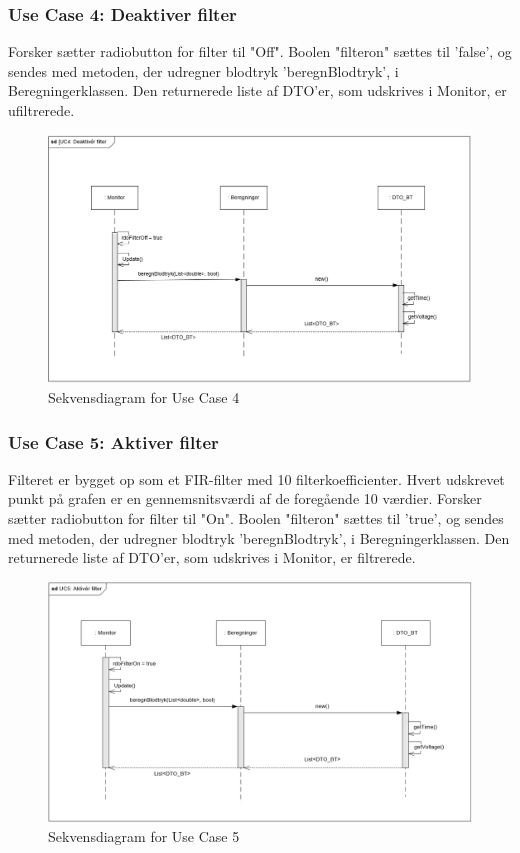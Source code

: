 \subsubsection{Use Case 4: Deaktiver filter}
Forsker sætter radiobutton for filter til "Off".
Boolen "filteron" sættes til 'false', og sendes med metoden, der udregner blodtryk 'beregnBlodtryk', i Beregningerklassen. Den returnerede liste af DTO'er, som udskrives i Monitor, er ufiltrerede.

\begin{figure}[H]
	\centering
	\includegraphics[width=1\textwidth]{Figurer/UC4_SD_SW}
	\caption{Sekvensdiagram for Use Case 4}
\end{figure}

\subsubsection{Use Case 5: Aktiver filter}
Filteret er bygget op som et FIR-filter med 10 filterkoefficienter. Hvert udskrevet punkt på grafen er en gennemsnitsværdi af de foregående 10 værdier.
Forsker sætter radiobutton for filter til "On".
Boolen "filteron" sættes til 'true', og sendes med metoden, der udregner blodtryk 'beregnBlodtryk', i Beregningerklassen. Den returnerede liste af DTO'er, som udskrives i Monitor, er filtrerede.

\begin{figure}[H]
	\centering
	\includegraphics[width=1\textwidth]{Figurer/UC5_SD_SW}
	\caption{Sekvensdiagram for Use Case 5}
\end{figure}

